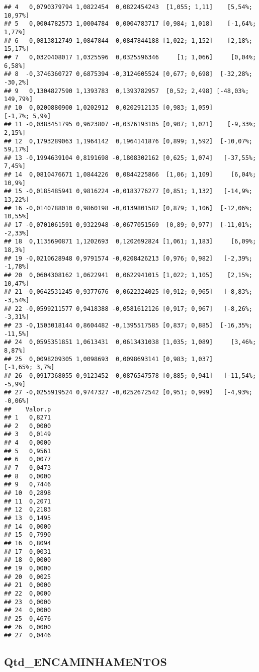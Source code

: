 \documentclass[
]{article}
\begin{document}
\begin{verbatim}
## 4   0,0790379794 1,0822454  0,0822454243  [1,055; 1,11]    [5,54%; 10,97%]
## 5   0,0004782573 1,0004784  0,0004783717 [0,984; 1,018]    [-1,64%; 1,77%]
## 6   0,0813812749 1,0847844  0,0847844188 [1,022; 1,152]    [2,18%; 15,17%]
## 7   0,0320408017 1,0325596  0,0325596346     [1; 1,066]     [0,04%; 6,58%]
## 8  -0,3746360727 0,6875394 -0,3124605524 [0,677; 0,698]  [-32,28%; -30,2%]
## 9   0,1304827590 1,1393783  0,1393782957  [0,52; 2,498] [-48,03%; 149,79%]
## 10  0,0200880900 1,0202912  0,0202912135 [0,983; 1,059]      [-1,7%; 5,9%]
## 11 -0,0383451795 0,9623807 -0,0376193105 [0,907; 1,021]    [-9,33%; 2,15%]
## 12  0,1793289063 1,1964142  0,1964141876 [0,899; 1,592]  [-10,07%; 59,17%]
## 13 -0,1994639104 0,8191698 -0,1808302162 [0,625; 1,074]   [-37,55%; 7,45%]
## 14  0,0810476671 1,0844226  0,0844225866  [1,06; 1,109]     [6,04%; 10,9%]
## 15 -0,0185485941 0,9816224 -0,0183776277 [0,851; 1,132]   [-14,9%; 13,22%]
## 16 -0,0140788010 0,9860198 -0,0139801582 [0,879; 1,106]  [-12,06%; 10,55%]
## 17 -0,0701061591 0,9322948 -0,0677051569  [0,89; 0,977]  [-11,01%; -2,33%]
## 18  0,1135690871 1,1202693  0,1202692824 [1,061; 1,183]     [6,09%; 18,3%]
## 19 -0,0210628948 0,9791574 -0,0208426213 [0,976; 0,982]   [-2,39%; -1,78%]
## 20  0,0604308162 1,0622941  0,0622941015 [1,022; 1,105]    [2,15%; 10,47%]
## 21 -0,0642531245 0,9377676 -0,0622324025 [0,912; 0,965]   [-8,83%; -3,54%]
## 22 -0,0599211577 0,9418388 -0,0581612126 [0,917; 0,967]   [-8,26%; -3,31%]
## 23 -0,1503018144 0,8604482 -0,1395517585 [0,837; 0,885]  [-16,35%; -11,5%]
## 24  0,0595351851 1,0613431  0,0613431038 [1,035; 1,089]     [3,46%; 8,87%]
## 25  0,0098209305 1,0098693  0,0098693141 [0,983; 1,037]     [-1,65%; 3,7%]
## 26 -0,0917368055 0,9123452 -0,0876547578 [0,885; 0,941]   [-11,54%; -5,9%]
## 27 -0,0255919524 0,9747327 -0,0252672542 [0,951; 0,999]   [-4,93%; -0,06%]
##    Valor.p
## 1   0,8271
## 2   0,0000
## 3   0,0149
## 4   0,0000
## 5   0,9561
## 6   0,0077
## 7   0,0473
## 8   0,0000
## 9   0,7446
## 10  0,2898
## 11  0,2071
## 12  0,2183
## 13  0,1495
## 14  0,0000
## 15  0,7990
## 16  0,8094
## 17  0,0031
## 18  0,0000
## 19  0,0000
## 20  0,0025
## 21  0,0000
## 22  0,0000
## 23  0,0000
## 24  0,0000
## 25  0,4676
## 26  0,0000
## 27  0,0446
\end{verbatim}

\hypertarget{qtd_encaminhamentos}{%
\subsection{Qtd\_ENCAMINHAMENTOS}\label{qtd_encaminhamentos}}
\end{document}
